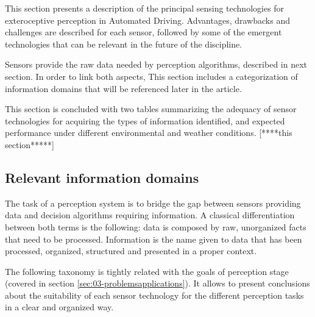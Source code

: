 
This section presents a description of the principal sensing technologies for
exteroceptive perception in Automated Driving. Advantages, drawbacks and 
challenges are described for each sensor, followed by some of the emergent 
technologies that can be relevant in the future of the discipline.

Sensors provide the raw data needed by perception algorithms, described in
next section. In order to link both aspects, This section includes a
categorization of information domains that will be referenced later in the
article.

This section is concluded with two tables summarizing the adequacy of sensor 
technologies for acquiring the types of information identified, and expected
performance under different environmental and weather conditions.
[****this section*****]

\subsection{Relevant information domains}

The task of a perception system is to bridge the gap between sensors providing 
data and decision algorithms requiring information.
A classical differentiation between both terms is the following: data is 
composed by raw, unorganized facts that need to be processed. 
Information is the name given to data that has been processed, organized, 
structured and presented in a proper context.

The following taxonomy is tightly related with the goals of perception stage
(covered in section \ref{sec:03-problemsapplications}). It allows to
present conclusions about the suitability of each sensor technology for
the different perception tasks in a clear and organized way.

